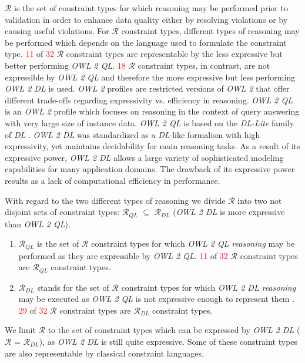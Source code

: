 \documentclass{acm_proc_article-sp}
\begin{document}
$\mathcal{R}$ is the set of constraint types for which reasoning may be performed prior to validation 
in order to enhance data quality either by resolving violations or by causing useful violations.
For $\mathcal{R}$ constraint types, different types of reasoning may be performed
which depends on the language used to formulate the constraint type. 
\textcolor{red}{11} of \textcolor{red}{32} $\mathcal{R}$ constraint types are representable by the less expressive but better performing \emph{OWL 2 QL}.
\textcolor{red}{18} $\mathcal{R}$ constraint types, in contrast, are not expressible by \emph{OWL 2 QL} and therefore the more expressive but less performing \emph{OWL 2 DL} is used.
\emph{OWL 2} profiles are restricted versions of \emph{OWL 2} that offer different trade-offs regarding expressivity vs. efficiency in reasoning. 
\emph{OWL 2 QL} is an \emph{OWL 2} profile which focuses on reasoning in the context of query answering with very large size of instance data. 
\emph{OWL 2 QL} is based on the \textit{DL-Lite} family of \emph{DL} \cite{Artale2009,Calvanese2007}.
\emph{OWL 2 DL} was standardized as a \emph{DL}-like formalism with high expressivity, yet maintains decidability for main reasoning tasks.
As a result of its expressive power, \emph{OWL 2 DL} allows a large variety of sophisticated modeling capabilities for many application domains.
The drawback of its expressive power results as a lack of computational efficiency in performance. 

With regard to the two different types of reasoning
we divide $\mathcal{R}$ into two not disjoint sets of constraint types: 
$\mathcal{R}_{QL}$ $\subseteq$ $\mathcal{R}_{DL}$ (\emph{OWL 2 DL} is more expressive than \emph{OWL 2 QL}).
\begin{enumerate}
\item $\mathcal{R}_{QL}$ is the set of $\mathcal{R}$ constraint types for which \emph{OWL 2 QL reasoning} may be performed as they are expressible by \emph{OWL 2 QL}.
\textcolor{red}{11} of \textcolor{red}{32} $\mathcal{R}$ constraint types are $\mathcal{R}_{QL}$ constraint types.
\item $\mathcal{R}_{DL}$ stands for the set of $\mathcal{R}$ constraint types for which \emph{OWL 2 DL reasoning} may be executed as \emph{OWL 2 QL} is not expressive enough to represent them \cite{owl2profiles2008}.
\textcolor{red}{29} of \textcolor{red}{32} $\mathcal{R}$ constraint types are $\mathcal{R}_{DL}$ constraint types.
\end{enumerate}
We limit $\mathcal{R}$ to the set of constraint types which can be expressed by \emph{OWL 2 DL}
($\mathcal{R}$ = $\mathcal{R}_{DL}$), as \emph{OWL 2 DL} is still quite expressive.
Some of these constraint types are also representable by classical constraint languages.
\end{document}
